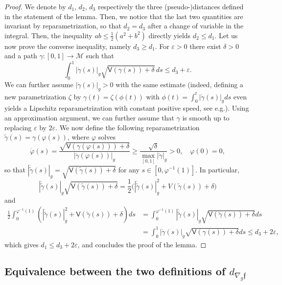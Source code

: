 \documentclass[10pt]{amsart}
\theoremstyle{definition}
\newcommand{\M}{\ensuremath{\mathcal M}}
\newcommand{\f}{\ensuremath{\mathfrak{f}}}
\newcommand\bnp{\begin{proof}}
\newcommand\enp{\end{proof}}
\newcommand\nablag{\nabla_{g}}
\let\e\varepsilon
\let\eps\varepsilon
\providecommand{\eg}{e.g.}\providecommand{\ie}{i.e.}\providecommand{\etc}{etc.}
\begin{document}
\bnp
We denote by $d_1$, $d_2$, $d_3$ respectively the three (pseudo-)distances defined in the statement of the lemma.
Then, we notice that the last two quantities are invariant by reparametrization, so that $d_2=d_3$ after a change of variable in the integral. Then, the inequality $ab\leq \frac{1}{2}(a^2+b^2)$ directly yields $d_2\leq d_1$. Let us now prove the converse inequality, namely $d_3 \geq d_1$. For $\e>0$ there exist $\delta>0$ and a path $\gamma:[0,1]\to \M$ such that\vspace*{-3pt}
\[
\int_0^1 |\dot{\gamma}(s)|_g\sqrt{\mathsf{V}(\gamma(s))+\delta} \, ds\leq d_{3}+\e.
\]
We can further assume $|\dot{\gamma}(s)|_g>0$ with the same estimate (indeed, defining a new parametrization $\zeta$ by $\gamma(t) = \zeta(\phi(t))$ with $\phi(t) = \int_0^t |\dot{\gamma}(s)|_g ds$ even yields a Lipschitz reparametrization with constant positive speed, see \eg \cite[Proof of Lem.\,3.16]{BarilariAgrachevBoscainBook:20}). Using an approximation argument, we can further assume that $\gamma$ is smooth up to replacing $\e$ by $2\eps$.
We now define the following reparametrization $\widetilde{\gamma}(s)=\gamma(\varphi(s))$, where $\varphi$ solves\vspace*{-3pt}
\[
\dot{\varphi}(s)=\frac{\sqrt{\mathsf{V}(\gamma(\varphi(s)))+\delta}}{|\dot{\gamma}(\varphi(s))|_g}\geq \frac{\sqrt{\delta}}{\max_{[0,1]} |\dot{\gamma}|_g}>0,\quad \varphi(0)=0,
\]
so that $|\dot{\widetilde{\gamma}}(s)|_g=\sqrt{\mathsf{V}(\widetilde{\gamma}(s))+\delta} $ for any $s\in [0,\varphi^{-1}(1)]$. In particular,
\[
|\dot{\widetilde{\gamma}}(s)|_g\sqrt{\mathsf{V}(\widetilde{\gamma}(s))+\delta}=\frac12\bigl(|\dot{\widetilde{\gamma}}(s)|_g^2+V(\widetilde{\gamma}(s))+\delta\bigr)
\]
and\vspace*{-3pt}
\begin{align*}
\frac12 \int_0^{\varphi^{-1}(1)}\left(|\dot{\widetilde{\gamma}}(s)|_g^2+\mathsf{V}(\widetilde{\gamma}(s))+\delta\right) ds
& = \int_0^{\varphi^{-1}(1)} |\dot{\widetilde{\gamma}}(s)|_g\sqrt{\mathsf{V}(\widetilde{\gamma}(s))+\delta} ds \\
&=\int_0^1 |\dot{\gamma}(s)|_g\sqrt{\mathsf{V}(\gamma(s))+\delta} ds\leq d_{3}+2\e,
\end{align*}
which gives $d_1\leq d_3+2\e$, and concludes the proof of the lemma.
\enp

\subsection{Equivalence between the two definitions of $d_{\nablag \f}$}
\end{document}
